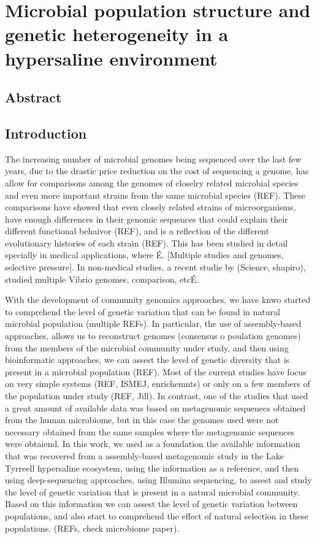 \chapter{Microbial population structure and genetic heterogeneity in a hypersaline environment}

\section{Abstract}

\section{Introduction}

The increasing number of microbial genomes being sequenced over the last few years, due to the drastic price reduction on the cost of sequencing a genome, has allow for comparisons among the genomes of closelry related microbial species and even more important strains from the same microbial species (REF). These comparisons have showed that even closely related strains of microorganisms, have enough differences in their genomic sequences that could explain their different functional behaivor (REF), and is a reflection of the different evolutionary histories of each strain (REF). This has been studied in detail specially in medical applications, where É. [Multiple studies and genomes, selective pressure].
In non-medical studies, a recent studie by (Science, shapiro), studied multiple Vibrio genomes, comparison, etcÉ.

With the development of community genomics approaches, we have knwo started to comprehend the level of genetic variation that can be found in natural microbial population (multiple REFs). In particular, the use of assembly-based approaches, allows us to reconstruct genomes (consensus o poulation genomes) from the members of the microbial community under study, and then using bioinformatic approaches, we can assest the level of genetic diversity that is present in a microbial population (REF). Most of the current studies have focus on very simple systems (REF, ISMEJ, enrichemnts) or only on a few members of the population under study (REF, Jill). In contrast, one of the studies that used a great amount of available data was based on metagenomic sequenecs obtained from the human microbiome, but in this case the genomes used were not necessary obtained from the same samples where the metagenomic sequences were obtaiend.
In this work, we used as a foundation the available information that was recovered from a assembly-based metagenomic study in the Lake Tyrreell hypersaline ecosystem, using the information as a reference, and then using deep-sequencing approaches, using Illumina sequencing, to assest and study the level of genetic variation that is present in a natural microbial community. Based on this information we can assest the level of genetic variation between populations, and also start to comprehend the effect of natural selection in these populations. (REFs, check microbiome paper).

